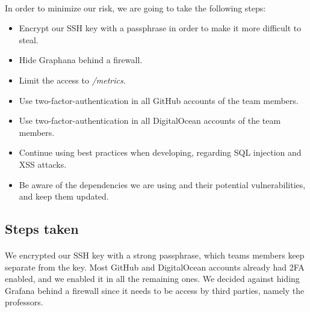 \paragraph{} In order to minimize our risk, we are going to take the following steps:
\begin{itemize}
	\item Encrypt our SSH key with a passphrase in order to make it more difficult to steal.
	\item Hide Graphana behind a firewall.
	\item Limit the access to \textit{/metrics}.
	\item Use two-factor-authentication in all GitHub accounts of the team members.
	\item Use two-factor-authentication in all DigitalOcean accounts of the team members.
	\item Continue using best practices when developing, regarding SQL injection and XSS attacks.
	\item Be aware of the dependencies we are using and their potential vulnerabilities, and keep them updated.
\end{itemize}

\subsection{Steps taken}
\paragraph{} 
We encrypted our SSH key with a strong passphrase, which teams members keep separate from the key. Most GitHub and DigitalOcean accounts already had 2FA enabled, and we enabled it in all the remaining ones. We decided against hiding Grafana behind a firewall since it needs to be access by third parties, namely the professors.
